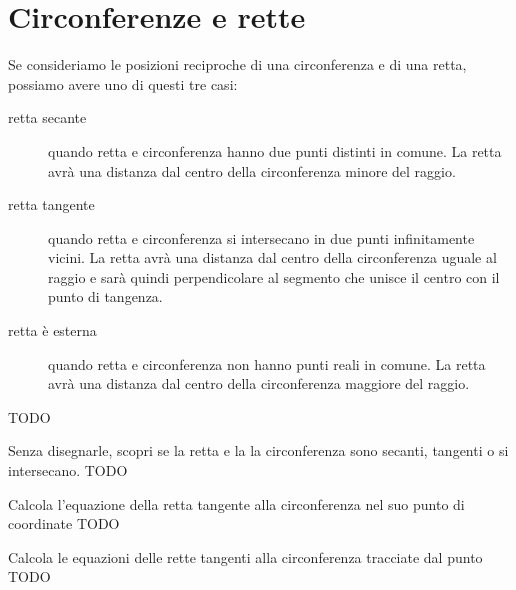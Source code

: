 \section{Circonferenze e rette}
\label{sec:circ_circrette}

Se consideriamo le posizioni reciproche di una circonferenza e di una retta, 
possiamo avere uno di questi tre casi:

\begin{description} %
 \item [retta secante] 
quando retta e circonferenza hanno due punti distinti in comune. La retta avrà 
una distanza dal centro della circonferenza minore del raggio.
 \item [retta tangente]
quando retta e circonferenza si intersecano in due punti infinitamente vicini. 
La retta avrà una distanza dal centro della circonferenza uguale al raggio e 
sarà quindi perpendicolare al segmento che unisce il centro con il punto di 
tangenza.
 \item [retta è esterna]
quando retta e circonferenza non hanno punti reali in comune. La retta avrà una 
distanza dal centro della circonferenza maggiore del raggio. 
\end{description}

\noindent\begin{minipage}{.48\textwidth}
TODO
\end{minipage}
\hfill
\begin{minipage}{.48\textwidth}
\begin{center}
\begin{inaccessibleblock}
\end{inaccessibleblock}
\end{center}
\end{minipage}


\begin{esempio}
 Senza disegnarle, scopri se la retta e la la circonferenza sono secanti, 
tangenti o si intersecano. TODO
\end{esempio}

\begin{esempio}
 Calcola l'equazione della retta tangente alla circonferenza nel suo punto di 
coordinate TODO
\end{esempio}

\begin{esempio}
 Calcola le equazioni delle rette tangenti alla circonferenza tracciate dal 
punto TODO
\end{esempio}

